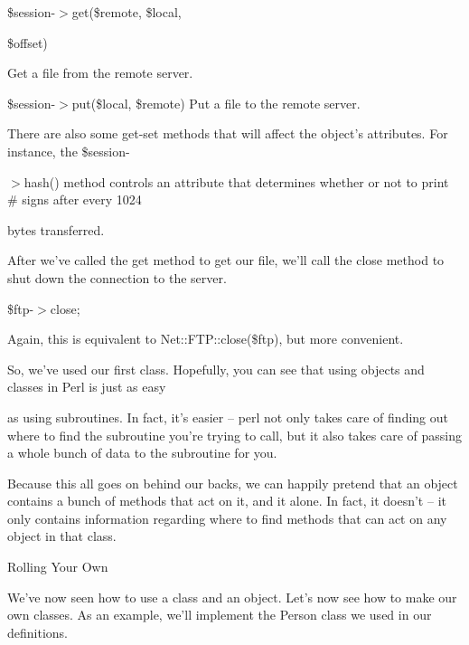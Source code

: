 \documentclass[a4paper,11pt]{book}
\begin{document}
\noindent 

\noindent \$session-$>$get(\$remote, \$local,

\noindent \$offset)

\noindent 

\noindent Get a file from the remote server.

\noindent 

\noindent \$session-$>$put(\$local, \$remote) Put a file to the remote server.

\noindent 

\noindent There are also some get-set methods that will affect the object's attributes. For instance, the \$session-

\noindent $>$hash() method controls an attribute that determines whether or not to print \# signs after every 1024

\noindent bytes transferred.

\noindent 

\noindent After we've called the get method to get our file, we'll call the close method to shut down the connection to the server.

\noindent 

\noindent \$ftp-$>$close;

\noindent 

\noindent Again, this is equivalent to Net::FTP::close(\$ftp), but more convenient.

\noindent 

\noindent So, we've used our first class. Hopefully, you can see that using objects and classes in Perl is just as easy

\noindent as using subroutines. In fact, it's easier -- perl not only takes care of finding out where to find the subroutine you're trying to call, but it also takes care of passing a whole bunch of data to the subroutine for you.

\noindent 

\noindent Because this all goes on behind our backs, we can happily pretend that an object contains a bunch of methods that act on it, and it alone. In fact, it doesn't -- it only contains information regarding where to find methods that can act on any object in that class.

\noindent 

\noindent 

\noindent Rolling Your Own

\noindent 

\noindent We've now seen how to use a class and an object. Let's now see how to make our own classes. As an example, we'll implement the Person class we used in our definitions.
\end{document}
